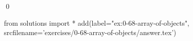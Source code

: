 
\begin{ex}
  \label{ex:0-68-array-of-objects}
  
  \qed
\end{ex}
\begin{python0}
from solutions import *
add(label="ex:0-68-array-of-objects",
    srcfilename='exercises/0-68-array-of-objects/answer.tex')
\end{python0}
